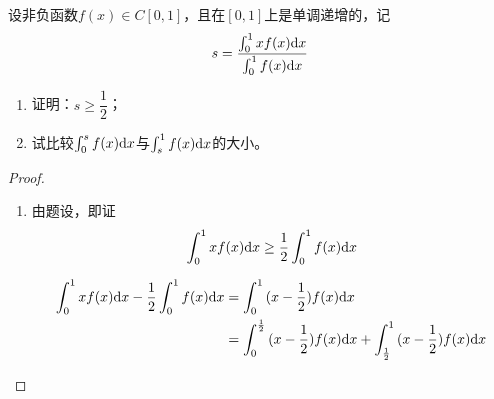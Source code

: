 \begin{proposition}

    设非负函数$f(x) \in C[0,1]$，且在$[0,1]$上是单调递增的，记
    $$s = \dfrac{\int_{0}^{1}{xf(x)}\mathrm{d} x}{\int_{0}^{1}{f(x)}\mathrm{d} x}$$

    \begin{enumerate}

        \item 证明：$s \geq \dfrac{1}{2}$；
        \item 试比较$\int_{0}^{s}{f(x)}\mathrm{d} x$与$\int_{s}^{1}{f(x)}\mathrm{d} x$的大小。
        
    \end{enumerate}

\end{proposition}

\begin{proof}

    \begin{enumerate}

        \item 
            由题设，即证
            $$\int_{0}^{1}{xf(x)}\mathrm{d} x \geq \dfrac{1}{2} \int_{0}^{1}{f(x)}\mathrm{d} x$$
            
            \begin{align*}
                \int_{0}^{1}{xf(x)}\mathrm{d} x - \dfrac{1}{2} \int_{0}^{1}{f(x)}\mathrm{d} x & = \int_{0}^{1}{(x - \dfrac{1}{2})f(x)}\mathrm{d} x \\
                & = \int_{0}^{\frac{1}{2}}{(x - \dfrac{1}{2})f(x)}\mathrm{d} x + \int_{\frac{1}{2}}^{1}{(x - \dfrac{1}{2})f(x)}\mathrm{d} x \\
            \end{align*}


\end{enumerate}
\end{proof}
